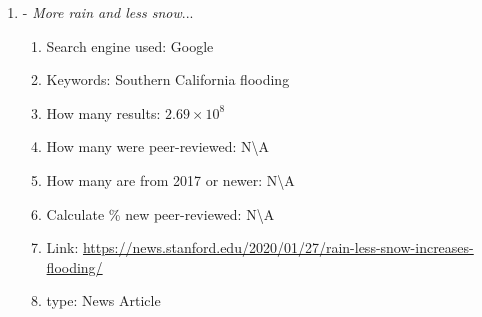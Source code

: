 \documentclass[a4paper,man,biblatex]{apa7}
\begin{document}
\begin{enumerate}
    \item \textcite{standford_2020} - \textit{More rain and less snow}...
        \begin{enumerate}
            \item Search engine used: Google
            \item Keywords: Southern California flooding 
            \item How many results: $2.69\times 10^8$ 
            \item How many were peer-reviewed: N\textbackslash A
            \item How many are from 2017 or newer:  N\textbackslash A
            \item Calculate \% new peer-reviewed: N\textbackslash A
            \item Link: \url{https://news.stanford.edu/2020/01/27/rain-less-snow-increases-flooding/}
            \item type: News Article 
        \end{enumerate}
    
    

\end{enumerate}
\end{document}
